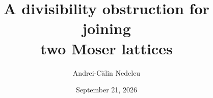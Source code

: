 \documentclass[11pt,reqno]{amsart}
\theoremstyle{plain}
\theoremstyle{definition}
\begin{document}
\ifdefined\geombinatorics
\makeatletter
\renewcommand{\maketitle}{%
  \thispagestyle{empty}%
  \begingroup
    \raggedright
    \fontsize{14}{17}\selectfont\bfseries
    A DIVISIBILITY OBSTRUCTION FOR JOINING TWO MOSER LATTICES\par
    \normalsize\bfseries Andrei-C\u{a}lin Nedelcu\par
    \normalfont\normalsize Bucharest, Romania\par
    \texttt{calin.nedelcu08@gmail.com}\par
  \endgroup
  \vspace{1.2\baselineskip}%
  \@setabstract
  \vspace{1\baselineskip}%
}
\makeatother
\fi

\title[A divisibility obstruction for joining two Moser lattices]
      {A divisibility obstruction for joining\\ two Moser lattices}

\author{Andrei-C\u{a}lin Nedelcu}
\address{Bucharest, Romania}


\date{September 21, 2026}
\end{document}
